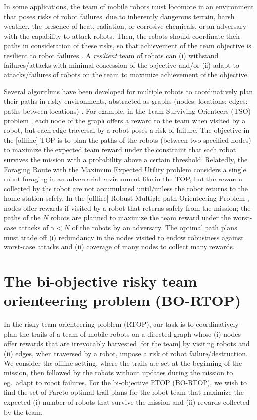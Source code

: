 \documentclass[11pt, oneside]{article}
\begin{document}
In some applications, the team of mobile robots must locomote in an environment that poses risks of robot failures, due to inherently dangerous terrain, harsh weather, the presence of heat, radiation, or corrosive chemicals, or an adversary with the capability to attack robots. Then, the robots should coordinate their paths in consideration of these risks, so that achievement of the team objective is resilient to robot failures \cite{zhou2021multi}. A \emph{resilient} team of robots can (i) withstand failures/attacks with minimal concession of the objective and/or (ii) adapt to attacks/failures of robots on the team to maximize achievement of the objective. 

Several algorithms have been developed for multiple robots to coordinatively plan their paths in risky environments, abstracted as graphs (nodes: locations; edges: paths between locations) \cite{jorgensen2018team,shi2023robust,zhou2022distributed}. 
For example, in the Team Surviving Orienteers (TSO) problem \cite{jorgensen2018team}, each node of the graph offers a reward to the team when visited by a robot, but each edge traversal by a robot poses a risk of failure. The objective in the [offline] TOP is to plan the paths of the robots (between two specified nodes) to maximize the expected team reward under the constraint that each robot survives the mission with a probability above a certain threshold. 
Relatedly, the Foraging Route with the Maximum Expected Utility problem \cite{di2022foraging} considers a single robot foraging in an adversarial environment like in the TOP, but the rewards collected by the robot are not accumulated until/unless the robot returns to the home station safely.
In the [offline] Robust Multiple-path Orienteering Problem \cite{shi2023robust}, nodes offer rewards if visited by a robot that returns safely from the mission; the paths of the $N$ robots are planned to maximize the team reward under the worst-case attacks of $\alpha<N$ of the robots by an adversary. The optimal path plans must trade off (i) redundancy in the nodes visited to endow robustness against worst-case attacks and (ii) coverage of many nodes to collect many rewards.

\section{The bi-objective risky team orienteering problem (BO-RTOP)}
In the risky team orienteering problem (RTOP), our task is to coordinatively plan the trails of a team of mobile robots on a directed graph whose (i) nodes offer rewards that are irrevocably harvested [for the team] by visiting robots and (ii) edges, when traversed by a robot, impose a risk of robot failure/destruction.
We consider the offline setting, where the trails are set at the beginning of the mission, then followed by the robots without updates during the mission to eg.\ adapt to robot failures. 
For the bi-objective RTOP (BO-RTOP), we wish to find the set of Pareto-optimal trail plans for the robot team that maximize the expected (i) number of robots that survive the mission and (ii) rewards collected by the team.
\end{document}
